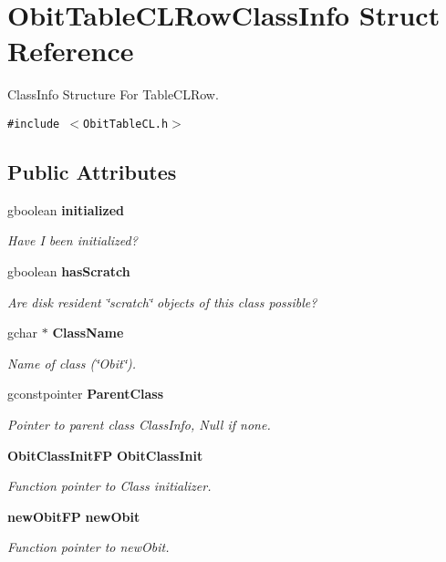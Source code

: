 \section{Obit\-Table\-CLRow\-Class\-Info Struct Reference}
\label{structObitTableCLRowClassInfo}
Class\-Info Structure For Table\-CLRow.  


{\tt \#include $<$Obit\-Table\-CL.h$>$}

\subsection*{Public Attributes}
\begin{CompactItemize}
\item 
gboolean {\bf initialized}
\begin{CompactList}\small\item\em Have I been initialized? \item\end{CompactList}\item 
gboolean {\bf has\-Scratch}
\begin{CompactList}\small\item\em Are disk resident \char`\"{}scratch\char`\"{} objects of this class possible? \item\end{CompactList}\item 
gchar $\ast$ {\bf Class\-Name}
\begin{CompactList}\small\item\em Name of class (\char`\"{}Obit\char`\"{}). \item\end{CompactList}\item 
gconstpointer {\bf Parent\-Class}
\begin{CompactList}\small\item\em Pointer to parent class Class\-Info, Null if none. \item\end{CompactList}\item 
{\bf Obit\-Class\-Init\-FP} {\bf Obit\-Class\-Init}
\begin{CompactList}\small\item\em Function pointer to Class initializer. \item\end{CompactList}\item 
{\bf new\-Obit\-FP} {\bf new\-Obit}
\begin{CompactList}\small\item\em Function pointer to new\-Obit. \item\end{CompactList}\item 

\end{CompactItemize}
